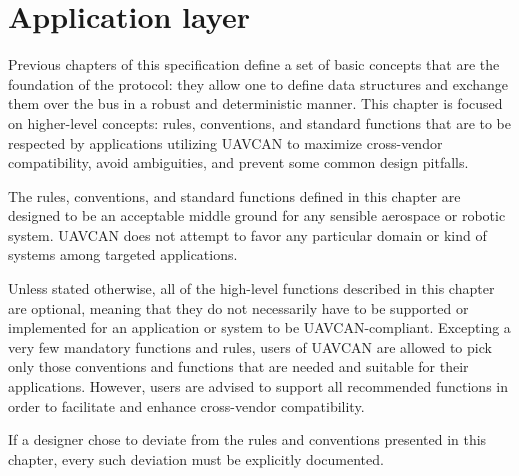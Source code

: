 \chapter{Application layer}\label{sec:application_layer}

Previous chapters of this specification define a set of basic concepts that are the foundation of the protocol:
they allow one to define data structures and exchange them over the bus in a robust and deterministic manner.
This chapter is focused on higher-level concepts: rules, conventions, and standard functions that are to be
respected by applications utilizing UAVCAN to maximize cross-vendor compatibility, avoid ambiguities, and
prevent some common design pitfalls.

The rules, conventions, and standard functions defined in this chapter are designed to be an acceptable middle
ground for any sensible aerospace or robotic system.
UAVCAN does not attempt to favor any particular domain or kind of systems among targeted applications.

Unless stated otherwise, all of the high-level functions described in this chapter are optional,
meaning that they do not necessarily have to be supported or implemented for an application or system to be
UAVCAN-compliant.
Excepting a very few mandatory functions and rules, users of UAVCAN are allowed to pick only those conventions
and functions that are needed and suitable for their applications.
However, users are advised to support all recommended functions in order to facilitate and enhance
cross-vendor compatibility.

If a designer chose to deviate from the rules and conventions presented in this chapter,
every such deviation must be explicitly documented.

\clearpage
\clearpage

